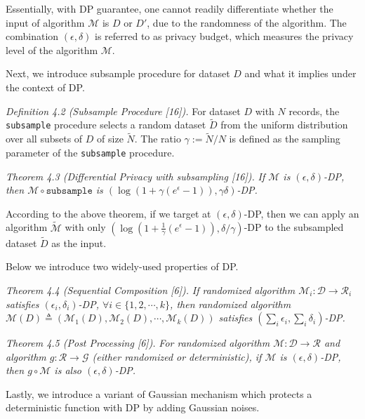 \documentclass[11pt]{article}
\begin{document}
Essentially, with DP guarantee, one cannot readily differentiate
whether the input of algorithm $\mathcal{M}$ is $D$ or $D'$, due to the randomness
of the algorithm. The combination $(\epsilon, \delta)$ is referred to as privacy
budget, which measures the privacy level of the algorithm $\mathcal{M}$.

Next, we introduce subsample procedure for dataset $D$ and what
it implies under the context of DP.

\textit{Definition 4.2 (Subsample Procedure [16]).} For dataset $D$ with $N$
records, the \texttt{subsample} procedure selects a random dataset $\tilde{D}$ from
the uniform distribution over all subsets of $D$ of size $\tilde{N}$. The ratio
$\gamma := \tilde{N}/N$ is defined as the sampling parameter of the \texttt{subsample}
procedure.

\textit{Theorem 4.3 (Differential Privacy with subsampling [16]).}
\textit{If $\mathcal{M}$ is $(\epsilon,\delta)$-DP, then
$\mathcal{M} \circ \texttt{subsample}$ is $(\log(1+\gamma(e^{\epsilon}-1)), \gamma\delta)$-DP.}

According to the above theorem, if we target at $(\epsilon,\delta)$-DP, then
we can apply an algorithm $\tilde{\mathcal{M}}$ with only
$(\log(1+\frac{1}{\gamma}(e^{\epsilon}-1)), \delta/\gamma)$-DP
to the subsampled dataset $\tilde{D}$ as the input.

Below we introduce two widely-used properties of DP.

\textit{Theorem 4.4 (Sequential Composition [6]).}
\textit{If randomized algorithm $\mathcal{M}_i : \mathcal{D} \to \mathcal{R}_i$
satisfies $(\epsilon_i,\delta_i)$-DP, $\forall i \in \{1,2,\cdots,k\}$, then
randomized algorithm $\mathcal{M}(D) \triangleq
(\mathcal{M}_1(D),\mathcal{M}_2(D),\cdots,\mathcal{M}_k(D))$
satisfies $(\sum_i \epsilon_i, \sum_i \delta_i)$-DP.}

\textit{Theorem 4.5 (Post Processing [6]).}
\textit{For randomized algorithm $\mathcal{M} : \mathcal{D} \to \mathcal{R}$
and algorithm $g : \mathcal{R} \to \mathcal{G}$ (either randomized or
deterministic), if $\mathcal{M}$ is $(\epsilon,\delta)$-DP, then
$g \circ \mathcal{M}$ is also $(\epsilon,\delta)$-DP.}

Lastly, we introduce a variant of Gaussian mechanism which protects
a deterministic function with DP by adding Gaussian noises.
\end{document}
